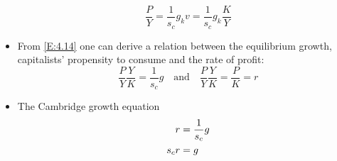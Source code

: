 \documentclass[a4paper,twoside]{article}
\numberwithin{equation}{section}
\numberwithin{figure}{section}
\begin{document}
\begin{itemize}
		\begin{equation}
			\frac{P}{Y} = \frac{1}{s_c} g_k v = \frac{1}{s_c} g_k \frac{K}{Y} \label{E:4.14}
		\end{equation}
		\item From \cref{E:4.14} one can derive a relation between the equilibrium growth, capitalists' propensity to consume and the rate of profit:
		\begin{equation}
			\frac{P}{Y}\frac{Y}{K} = \frac{1}{s_c}g
			\quad \text{and} \quad
			\frac{P}{Y}\frac{Y}{K} = \frac{P}{K} = r \label{E:4.15}
		\end{equation}
		\item The Cambridge growth equation
		\begin{align}
			r &=  \frac{1}{s_c}g \notag\\
			s_c r &= g \label{E:4.16}
		\end{align}
	\end{itemize}
\end{document}
